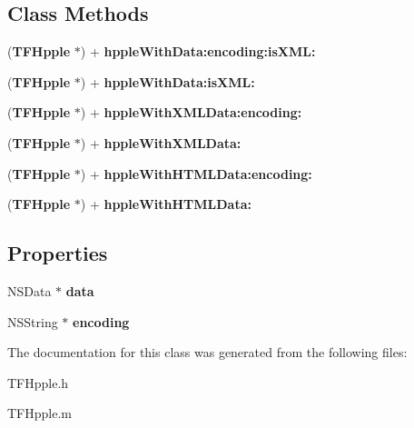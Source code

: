 \subsection*{Class Methods}
\begin{DoxyCompactItemize}
\item 
({\bf T\+F\+Hpple} $\ast$) + {\bfseries hpple\+With\+Data\+:encoding\+:is\+X\+M\+L\+:}\label{interface_t_f_hpple_ae90410d514268088d6c782bb75314523}

\item 
({\bf T\+F\+Hpple} $\ast$) + {\bfseries hpple\+With\+Data\+:is\+X\+M\+L\+:}\label{interface_t_f_hpple_a3a71c0b14f603c7a0c9a51e94b1901db}

\item 
({\bf T\+F\+Hpple} $\ast$) + {\bfseries hpple\+With\+X\+M\+L\+Data\+:encoding\+:}\label{interface_t_f_hpple_a60815c4d5bbf7d15d1970a63d6c069e9}

\item 
({\bf T\+F\+Hpple} $\ast$) + {\bfseries hpple\+With\+X\+M\+L\+Data\+:}\label{interface_t_f_hpple_a9f6634ba04c1756a00919171cc26ea6b}

\item 
({\bf T\+F\+Hpple} $\ast$) + {\bfseries hpple\+With\+H\+T\+M\+L\+Data\+:encoding\+:}\label{interface_t_f_hpple_ae83067b1e5c80647d2bd1d19d5d391ff}

\item 
({\bf T\+F\+Hpple} $\ast$) + {\bfseries hpple\+With\+H\+T\+M\+L\+Data\+:}\label{interface_t_f_hpple_a05ff6db676283713ae714fcfb9a485a9}

\end{DoxyCompactItemize}
\subsection*{Properties}
\begin{DoxyCompactItemize}
\item 
N\+S\+Data $\ast$ {\bfseries data}\label{interface_t_f_hpple_af8002e454472111f4af37d7b48ccbade}

\item 
N\+S\+String $\ast$ {\bfseries encoding}\label{interface_t_f_hpple_a790232945cc92e254fb9788089273d1f}

\end{DoxyCompactItemize}


The documentation for this class was generated from the following files\+:\begin{DoxyCompactItemize}
\item 
T\+F\+Hpple.\+h\item 
T\+F\+Hpple.\+m\end{DoxyCompactItemize}
